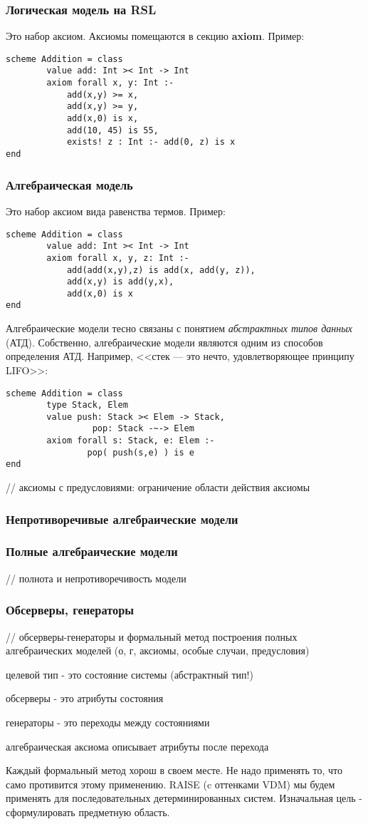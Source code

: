 \documentclass[14pt, twoside]{extreport}
\newcommand{\head}[1]{\vspace{1cm}\subsubsection*{#1}}
\begin{document}
\head{Логическая модель на RSL}
Это набор аксиом. Аксиомы помещаются в секцию \textbf{axiom}. Пример:
\begin{lstlisting}
scheme Addition = class
        value add: Int >< Int -> Int
        axiom forall x, y: Int :-
            add(x,y) >= x,
            add(x,y) >= y,
            add(x,0) is x,
            add(10, 45) is 55,
            exists! z : Int :- add(0, z) is x
end
\end{lstlisting}

\head{Алгебраическая модель}
Это набор аксиом вида равенства термов. Пример:
\begin{lstlisting}
scheme Addition = class
        value add: Int >< Int -> Int
        axiom forall x, y, z: Int :-
            add(add(x,y),z) is add(x, add(y, z)),
            add(x,y) is add(y,x),
            add(x,0) is x
end
\end{lstlisting}

Алгебраические модели тесно связаны с понятием \emph{абстрактных типов данных} (АТД). Собственно, алгебраические модели являются одним из способов определения АТД. Например, <<стек --- это нечто, удовлетворяющее принципу LIFO>>:
\begin{lstlisting}
scheme Addition = class
        type Stack, Elem
        value push: Stack >< Elem -> Stack,
                 pop: Stack -~-> Elem
        axiom forall s: Stack, e: Elem :-
                pop( push(s,e) ) is e
end
\end{lstlisting}

// аксиомы с предусловиями: ограничение области действия аксиомы

\head{Непротиворечивые алгебраические модели}

\head{Полные алгебраические модели}

// полнота и непротиворечивость модели

\head{Обсерверы, генераторы}

// обсерверы-генераторы и формальный метод построения полных алгебраических моделей (о, г, аксиомы, особые случаи, предусловия)

целевой тип - это состояние системы (абстрактный тип!)

обсерверы - это атрибуты состояния

генераторы - это переходы между состояниями

алгебраическая аксиома описывает атрибуты после перехода

Каждый формальный метод хорош в своем месте. Не надо применять то, что само противится этому применению. RAISE (c оттенками VDM) мы будем применять для последовательных детерминированных систем. Изначальная цель - сформулировать предметную область.
\end{document}
